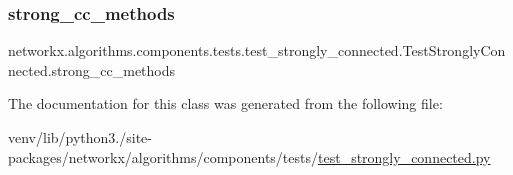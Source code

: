 \subsubsection{\texorpdfstring{strong\+\_\+cc\+\_\+methods}{strong\_cc\_methods}}
{\footnotesize\ttfamily networkx.\+algorithms.\+components.\+tests.\+test\+\_\+strongly\+\_\+connected.\+Test\+Strongly\+Connected.\+strong\+\_\+cc\+\_\+methods\hspace{0.3cm}{\ttfamily [static]}}



The documentation for this class was generated from the following file\+:\begin{DoxyCompactItemize}
\item 
venv/lib/python3./site-\/packages/networkx/algorithms/components/tests/\hyperlink{test__strongly__connected_8py}{test\+\_\+strongly\+\_\+connected.\+py}\end{DoxyCompactItemize}
